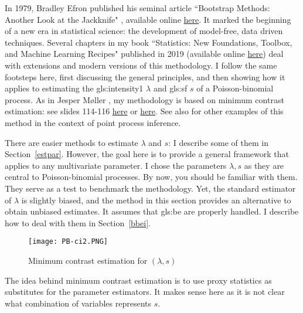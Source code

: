 \documentclass[10pt]{article}
\begin{document}
In 1979, Bradley Efron published his seminal article ``Bootstrap Methods: Another Look at the Jackknife" 
\cite{be1979}, 
available
online \href{https://projecteuclid.org/journals/annals-of-statistics/volume-7/issue-1/Bootstrap-Methods-Another-Look-at-the-Jackknife/10.1214/aos/1176344552.full}{here}. 
It marked the beginning of a new era in statistical science: the development of model-free, data driven techniques. Several chapters in my book
  ``Statistics: New Foundations, Toolbox, and Machine Learning Recipes" \cite{vgstats} published in 2019
 (available online \href{https://github.com/VincentGranville/Machine-Learning}{here})
  deal with extensions and modern versions of this methodology. I follow the same footsteps here, first discussing the general principles, and then showing how it applies
  to estimating the 
\gls{gls:intensity1} $\lambda$ and 
\gls{gls:sf} $s$ 
of a Poisson-binomial process. As in 
Jesper Møller \cite{momo55}, my methodology is based on 
\textcolor{index}{minimum contrast estimation}: see slides 114-116 \href{https://cimpatogo2018.sciencesconf.org/data/pages/Handout_Moller_CIMPA_Togo_2018.pdf}{here} or
\href{https://drive.google.com/file/d/1y5TZXvAL8fP9G5UkmV3npKgoVB0YWtXk/view?usp=sharing}{here}. See also \cite{hghf} for other examples of this method in the
context of point process inference.

There are easier methods to estimate $\lambda$ and $s$: I describe some of them in Section~\ref{estpar}. However, the goal here 
is to provide a general framework that applies to any multivariate parameter. I chose the parameters $\lambda,s$ as they are central to Poisson-binomial processes. By now,
you should be familiar with them. They serve as a test to benchmark the methodology. Yet, the standard estimator of $\lambda$ is slightly biased, and the method in this section provides
an alternative to obtain unbiased estimates. It assumes that \gls{gls:be} are properly handled. I describe how to deal with them 
in Section~\ref{bbei}.


\begin{figure}[H]
\centering
\texttt{[image: PB-ci2.PNG]}
\caption{Minimum contrast estimation for $(\lambda,s)$}
\label{fig:pbci}
\end{figure}

The idea behind minimum contrast estimation is to use proxy statistics as substitutes for the parameter estimators. It makes sense here as it is not clear what
combination of variables represents $s$. 
\end{document}
